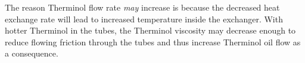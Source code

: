 The reason Therminol flow rate {\it may} increase is because the decreased heat exchange rate will lead to increased temperature inside the exchanger.  With hotter Therminol in the tubes, the Therminol viscosity may decrease enough to reduce flowing friction through the tubes and thus increase Therminol oil flow as a consequence.




